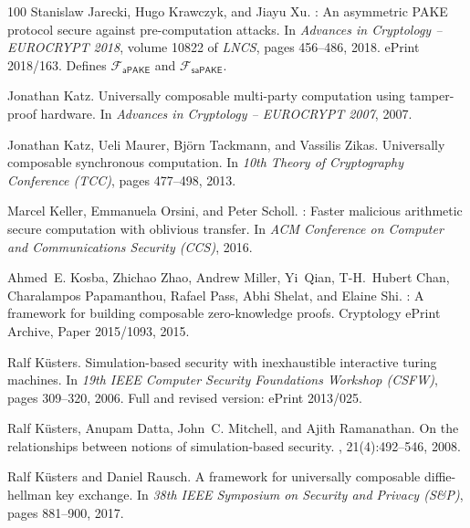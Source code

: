 \documentclass[11pt,a4paper]{article}
\begin{document}
\begin{thebibliography}{100}
Stanislaw Jarecki, Hugo Krawczyk, and Jiayu Xu.
: An asymmetric {PAKE} protocol secure against
  pre-computation attacks.
\newblock In {\em Advances in Cryptology -- EUROCRYPT 2018}, volume 10822 of
  {\em LNCS}, pages 456--486, 2018.
\newblock ePrint 2018/163. Defines $\mathcal{F}_{\mathsf{aPAKE}}$ and
  $\mathcal{F}_{\mathsf{saPAKE}}$.

Jonathan Katz.
\newblock Universally composable multi-party computation using tamper-proof
  hardware.
\newblock In {\em Advances in Cryptology -- EUROCRYPT 2007}, 2007.

Jonathan Katz, Ueli Maurer, Bj{\"o}rn Tackmann, and Vassilis Zikas.
\newblock Universally composable synchronous computation.
\newblock In {\em 10th Theory of Cryptography Conference (TCC)}, pages
  477--498, 2013.

Marcel Keller, Emmanuela Orsini, and Peter Scholl.
: Faster malicious arithmetic secure computation with
  oblivious transfer.
\newblock In {\em ACM Conference on Computer and Communications Security
  (CCS)}, 2016.

Ahmed~E. Kosba, Zhichao Zhao, Andrew Miller, Yi~Qian, T-H.~Hubert Chan,
  Charalampos Papamanthou, Rafael Pass, Abhi Shelat, and Elaine Shi.
: A framework for building composable zero-knowledge proofs.
\newblock Cryptology ePrint Archive, Paper 2015/1093, 2015.

Ralf K{\"u}sters.
\newblock Simulation-based security with inexhaustible interactive turing
  machines.
\newblock In {\em 19th IEEE Computer Security Foundations Workshop (CSFW)},
  pages 309--320, 2006.
\newblock Full and revised version: ePrint 2013/025.

Ralf K{\"u}sters, Anupam Datta, John~C. Mitchell, and Ajith Ramanathan.
\newblock On the relationships between notions of simulation-based security.
, 21(4):492--546, 2008.

Ralf K{\"u}sters and Daniel Rausch.
\newblock A framework for universally composable diffie-hellman key exchange.
\newblock In {\em 38th IEEE Symposium on Security and Privacy (S\&P)}, pages
  881--900, 2017.


\end{thebibliography}
\end{document}
